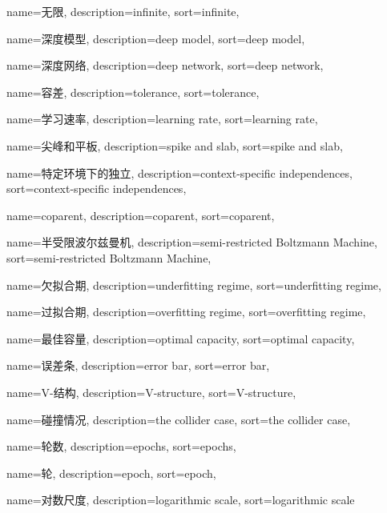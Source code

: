 {
  name=无限,
  description={infinite},
  sort={infinite},
}

{
  name=深度模型,
  description={deep model},
  sort={deep model},
}

{
  name=深度网络,
  description={deep network},
  sort={deep network},
}

{
  name=容差,
  description={tolerance},
  sort={tolerance},
}

{
  name=学习速率,
  description={learning rate},
  sort={learning rate},
}

{
  name=尖峰和平板,
  description={spike and slab},
  sort={spike and slab},
}

{
  name=特定环境下的独立,
  description={context-specific independences},
  sort={context-specific independences},
}

{
  name=coparent,
  description={coparent},
  sort={coparent},
}

{
  name=半受限波尔兹曼机,
  description={semi-restricted Boltzmann Machine},
  sort={semi-restricted Boltzmann Machine},
}

{
  name=欠拟合期,
  description={underfitting regime},
  sort={underfitting regime},
}

{
  name=过拟合期,
  description={overfitting regime},
  sort={overfitting regime},
}

{
  name=最佳容量,
  description={optimal capacity},
  sort={optimal capacity},
}

{
  name=误差条,
  description={error bar},
  sort={error bar},
}

{
  name=V-结构,
  description={V-structure},
  sort={V-structure},
}

{
  name=碰撞情况,
  description={the collider case},
  sort={the collider case},
}

{
  name=轮数,
  description={epochs},
  sort={epochs},
}

{
  name=轮,
  description={epoch},
  sort={epoch},
}

{
  name=对数尺度,
  description={logarithmic scale},
  sort={logarithmic scale}
}

